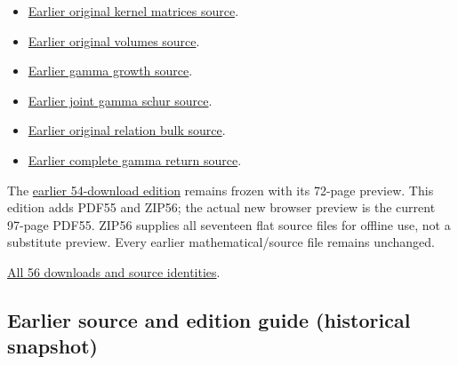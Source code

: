 \documentclass[
]{article}
\providecommand{\tightlist}{%
  \setlength{\itemsep}{0pt}\setlength{\parskip}{0pt}}
\begin{document}
\begin{itemize}
\tightlist
\item
  \href{https://github.com/KokunoYumeto/zeta-function-research-reader/tree/5817ef9027257375b6ff3de7048b3331077251e7/workbenches/splitzero-tandem/continuations/20260914-original-kernel-matrices}{Earlier
  original kernel matrices source}.
\item
  \href{https://github.com/KokunoYumeto/zeta-function-research-reader/tree/1c8ec52c85c173adc9f8403a8a26914955e2f5a9/workbenches/splitzero-tandem/continuations/20260914-original-volumes}{Earlier
  original volumes source}.
\item
  \href{https://github.com/KokunoYumeto/zeta-function-research-reader/tree/41f020e0475429943252e69a1b4edd849393c780/workbenches/splitzero-tandem/continuations/20260914-gamma-growth}{Earlier
  gamma growth source}.
\item
  \href{https://github.com/KokunoYumeto/zeta-function-research-reader/tree/2be3b23974bf040f4ea06240b8a4b85372f7c71d/workbenches/splitzero-tandem/continuations/20260914-joint-gamma-schur}{Earlier
  joint gamma schur source}.
\item
  \href{https://github.com/KokunoYumeto/zeta-function-research-reader/tree/01fc8820e3a3ea69afa22b8ab1b0b5ca61869456/workbenches/splitzero-tandem/continuations/20260914-original-relation-bulk}{Earlier
  original relation bulk source}.
\item
  \href{https://github.com/KokunoYumeto/zeta-function-research-reader/tree/01fc8820e3a3ea69afa22b8ab1b0b5ca61869456/workbenches/splitzero-tandem/continuations/20260914-complete-gamma-return}{Earlier
  complete gamma return source}.
\end{itemize}

The \href{https://doi.org/10.5281/zenodo.22758480}{earlier 54-download
edition} remains frozen with its 72-page preview. This edition adds
PDF55 and ZIP56; the actual new browser preview is the current 97-page
PDF55. ZIP56 supplies all seventeen flat source files for offline use,
not a substitute preview. Every earlier mathematical/source file remains
unchanged.

\href{calculation_edition_20260914_conductor_kernel/README.md}{All 56
downloads and source identities}.

\subsection{Earlier source and edition guide (historical
snapshot)}\label{earlier-source-and-edition-guide-historical-snapshot-12}
\end{document}
